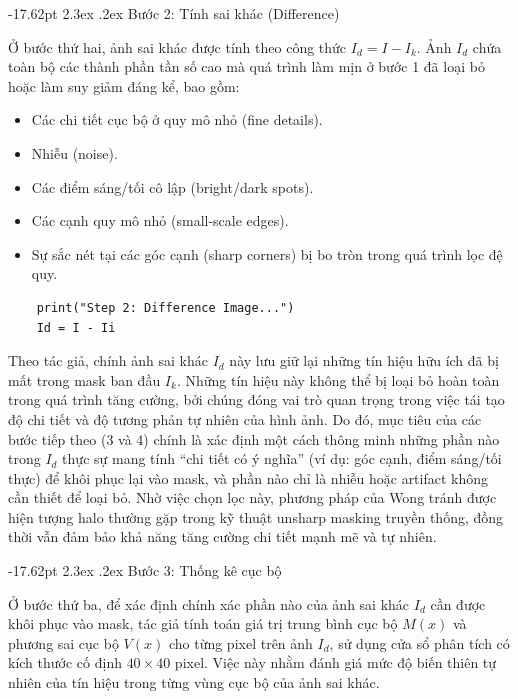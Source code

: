 \documentclass[a4paper]{report}
\makeatletter
\renewcommand\section{\@startsection{section}{1}{\z@}%
    {-17.62pt \@plus -5.89pt \@minus -1.18pt}%
    {2.3ex \@plus .2ex}%
    {\normalfont\fontsize{14.95pt}{16.31pt}\selectfont\bfseries}}%
\makeatother
\begin{document}
\section{Bước 2: Tính sai khác (Difference)}

Ở bước thứ hai, ảnh sai khác được tính theo công thức $I_d = I - I_k$. Ảnh $I_d$ chứa
toàn bộ các thành phần tần số cao mà quá trình làm mịn ở bước 1 đã loại bỏ hoặc
làm suy giảm đáng kể, bao gồm:

\begin{itemize}
    \item Các chi tiết cục bộ ở quy mô nhỏ (fine details).
    \item Nhiễu (noise).
    \item Các điểm sáng/tối cô lập (bright/dark spots).
    \item Các cạnh quy mô nhỏ (small-scale edges).
    \item Sự sắc nét tại các góc cạnh (sharp corners) bị bo tròn trong quá trình lọc đệ
          quy.
\end{itemize}

\begin{lstlisting}
    print("Step 2: Difference Image...")
    Id = I - Ii
\end{lstlisting}

Theo tác giả, chính ảnh sai khác $I_d$ này lưu giữ lại những tín hiệu hữu ích đã bị
mất trong mask ban đầu $I_k$. Những tín hiệu này không thể bị loại bỏ hoàn toàn
trong quá trình tăng cường, bởi chúng đóng vai trò quan trọng trong việc tái tạo
độ chi tiết và độ tương phản tự nhiên của hình ảnh. Do đó, mục tiêu của các bước
tiếp theo (3 và 4) chính là xác định một cách thông minh những phần nào trong
$I_d$ thực sự mang tính ``chi tiết có ý nghĩa'' (ví dụ: góc cạnh, điểm sáng/tối thực) để
khôi phục lại vào mask, và phần nào chỉ là nhiễu hoặc artifact không cần thiết để
loại bỏ. Nhờ việc chọn lọc này, phương pháp của Wong tránh được hiện tượng halo
thường gặp trong kỹ thuật unsharp masking truyền thống, đồng thời vẫn đảm bảo
khả năng tăng cường chi tiết mạnh mẽ và tự nhiên.

\section{Bước 3: Thống kê cục bộ}

Ở bước thứ ba, để xác định chính xác phần nào của ảnh sai khác $I_d$ cần được khôi
phục vào mask, tác giả tính toán giá trị trung bình cục bộ $M(x)$ và phương sai
cục bộ $V(x)$ cho từng pixel trên ảnh $I_d$, sử dụng cửa sổ phân tích có kích thước
cố định $40\times40$ pixel. Việc này nhằm đánh giá mức độ biến thiên tự nhiên của tín
hiệu trong từng vùng cục bộ của ảnh sai khác.
\end{document}
